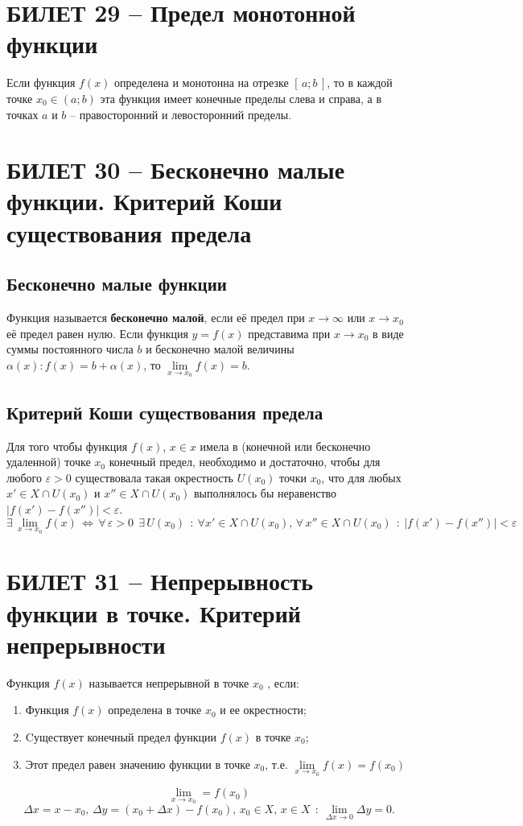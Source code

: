 \documentclass{article}
\begin{document}
\section{БИЛЕТ 29 -- Предел монотонной функции}
Если функция $f(x)$ определена и монотонна на отрезке $[\,a;b\,]$, то в каждой точке $x_0\in (a;b)$ эта функция имеет конечные пределы слева и справа, а в точках $a$ и $b$ -- правосторонний и левосторонний пределы.
\newpage
\section{БИЛЕТ 30 -- Бесконечно малые функции. Критерий Коши существования предела}
\subsection{Бесконечно малые функции}
Функция называется \textbf{бесконечно малой}, если её предел при $x\to\infty$ или $x\to x_0$  её предел равен нулю.
\newline
Если функция $y=f(x)$ представима при $x\to x_0$ в виде суммы постоянного числа $b$ и бесконечно малой величины $\alpha(x): f (x)=b+ \alpha(x)$, то $\lim\limits_{x\to x_0} f(x)=b$.
\subsection{Критерий Коши существования предела}
Для того чтобы функция $f(x)$, $x\in x$ имела в (конечной или бесконечно удаленной) точке $x_0$ конечный предел, необходимо и достаточно, чтобы для любого $\varepsilon > 0$ существовала такая окрестность $U(x_0)$ точки $x_0$, что для любых $x'\in X\cap U(x_0)$ и $x''\in X\cap U(x_0)$   выполнялось бы неравенство $|f(x')-f(x'')|<\varepsilon$.
$$ \exists\,\lim_{x\to x_0} f(x)\,\Leftrightarrow\,\forall\,\varepsilon>0\:\:\exists\,U(x_0)\:\: :\:\forall x'\in X\cap U(x_0), \,\forall\,x''\in X\cap U(x_0)\:\: :\: |f(x')-f(x'')|<\varepsilon  $$


\newpage
\section{БИЛЕТ 31 -- Непрерывность функции в точке. Критерий непрерывности}
Функция $f(x)$ называется непрерывной в точке $x_0$ , если:
\begin{enumerate}
    \item Функция $f(x)$ определена в точке $x_0$  и ее окрестности;
    \item Cуществует конечный предел функции $f(x)$  в точке $x_0$;
    \item Этот предел равен значению функции в точке $x_0$, т.е. $\lim\limits_{x\to x_0} f(x)=f(x_0)$
\end{enumerate}
$$ \lim_{x\to x_0} = f(x_0) $$
$$ \Delta x=x-x_0,\,\Delta y=(x_0+\Delta x)-f(x_0),\,x_0\in X,\,x\in X\:\: :\:\lim_{\Delta x\to 0} \Delta y = 0. $$
\newpage
\end{document}
